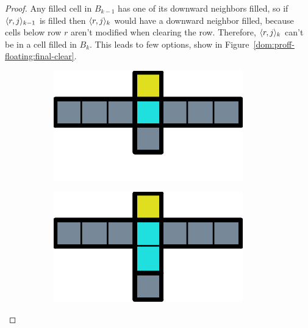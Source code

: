 \begin{proof}
  Any filled cell in $B_{k-1}$ has one of its downward neighbors filled, so if $\cell[r]_{k-1}$ is filled then $\cell[r]_k$ would have a downward neighbor filled, because cells below row $r$ aren't modified when clearing the row. Therefore, $\cell[r]_k$ can't be in a cell filled in $B_k$. This leads to few options, show in Figure~\ref{dom:proff-floating:final-clear}.

  \begin{figure}[ht] \label{dom:proff-floating:final-clear}
  \centering
  \begin{subfigure}[b]{0.15\textwidth}
    \centering
    \includegraphics[width=0.9\textwidth]{./pictures/dominoes/proff-floating/scenario-1.pdf}
    \caption{}
    \label{floating:a}
  \end{subfigure}
  \begin{subfigure}[b]{0.15\textwidth}
    \centering
    \includegraphics[width=0.9\textwidth]{./pictures/dominoes/proff-floating/scenario-2.pdf}
    \caption{}
    \label{floating:b}
  \end{subfigure}
  \begin{subfigure}[b]{0.15\textwidth}
    \centering

\end{subfigure}
\end{figure}
\end{proof}
